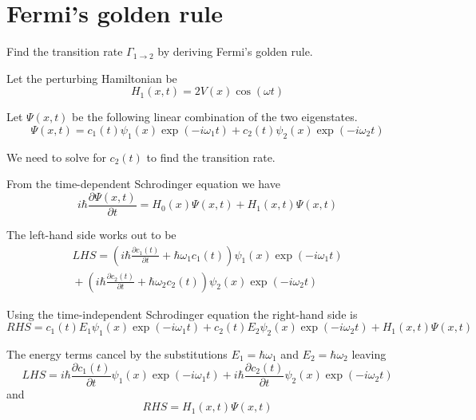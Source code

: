 \documentclass[12pt]{article}
\begin{document}
\section*{Fermi's golden rule}

Find the transition rate $\Gamma_{1\rightarrow2}$
by deriving Fermi's golden rule.

\bigskip

Let the perturbing Hamiltonian be
\begin{equation*}
H_1(x,t)=2V(x)\cos(\omega t)
\end{equation*}

Let $\Psi(x,t)$ be the following linear combination of the two eigenstates.
\begin{equation*}
\Psi(x,t)=c_1(t)\psi_1(x)\exp(-i\omega_1t)+c_2(t)\psi_2(x)\exp(-i\omega_2t)
\end{equation*}

We need to solve for $c_2(t)$ to find the transition rate.

\bigskip

From the time-dependent Schrodinger equation we have
\begin{equation*}
i\hbar\frac{\partial\Psi(x,t)}{\partial t}=H_0(x)\Psi(x,t)+H_1(x,t)\Psi(x,t)
\end{equation*}

The left-hand side works out to be
\begin{multline*}
LHS=\left(i\hbar\frac{\partial c_1(t)}{\partial t}+\hbar\omega_1c_1(t)\right)
\psi_1(x)\exp(-i\omega_1t)
\\
{}+\left(i\hbar\frac{\partial c_2(t)}{\partial t}+\hbar\omega_2c_2(t)\right)
\psi_2(x)\exp(-i\omega_2t)
\end{multline*}

Using the time-independent Schrodinger equation the right-hand side is
\begin{equation*}
RHS=c_1(t)E_1\psi_1(x)\exp(-i\omega_1t)
+c_2(t)E_2\psi_2(x)\exp(-i\omega_2t)+H_1(x,t)\Psi(x,t)
\end{equation*}

The energy terms cancel by the substitutions
$E_1=\hbar\omega_1$ and $E_2=\hbar\omega_2$ leaving
\begin{equation*}
LHS=i\hbar\frac{\partial c_1(t)}{\partial t}\psi_1(x)\exp(-i\omega_1t)
+i\hbar\frac{\partial c_2(t)}{\partial t}\psi_2(x)\exp(-i\omega_2t)
\end{equation*}
%
and
\begin{equation*}
RHS=H_1(x,t)\Psi(x,t)
\end{equation*}
\end{document}
